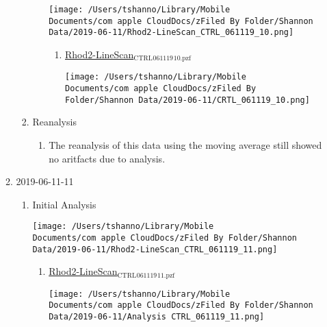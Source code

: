 \documentclass[11pt]{article}
\begin{document}
\begin{enumerate}
\begin{enumerate}
\begin{enumerate}
\begin{enumerate}
\label{sec:orgd72f3bb}
\begin{center}
\texttt{[image: /Users/tshanno/Library/Mobile Documents/com~apple~CloudDocs/zFiled By Folder/Shannon Data/2019-06-11/Rhod2-LineScan\_CTRL\_061119\_10.png]}
\end{center}
\begin{enumerate}
\item \href{file:///Users/tshanno/Library/Mobile Documents/com\~apple\~CloudDocs/zFiled By Folder/Shannon Data/2019-06-11/Rhod2-LineScan\_CTRL\_061119\_10.pzf}{Rhod2-LineScan\(_{\text{CTRL}}\)\(_{\text{061119}}\)\(_{\text{10.pzf}}\)}
\label{sec:org8c3920f}
\begin{center}
\texttt{[image: /Users/tshanno/Library/Mobile Documents/com~apple~CloudDocs/zFiled By Folder/Shannon Data/2019-06-11/CRTL\_061119\_10.png]}
\end{center}
\end{enumerate}
\end{enumerate}
\item Reanalysis
\label{sec:org20cb0ad}
\begin{enumerate}
\item The reanalysis of this data using the moving average still showed no aritfacts due to analysis.
\label{sec:orgea255bd}
\end{enumerate}
\end{enumerate}
\item 2019-06-11-11
\label{sec:org82d7336}
\begin{enumerate}
\item Initial Analysis
\label{sec:org240610e}
\begin{center}
\texttt{[image: /Users/tshanno/Library/Mobile Documents/com~apple~CloudDocs/zFiled By Folder/Shannon Data/2019-06-11/Rhod2-LineScan\_CTRL\_061119\_11.png]}
\end{center}
\begin{enumerate}
\item \href{file:///Users/tshanno/Library/Mobile Documents/com\~apple\~CloudDocs/zFiled By Folder/Shannon Data/2019-06-11/Rhod2-LineScan\_CTRL\_061119\_11.pzf}{Rhod2-LineScan\(_{\text{CTRL}}\)\(_{\text{061119}}\)\(_{\text{11.pzf}}\)}
\label{sec:orgbce48e7}
\begin{center}
\texttt{[image: /Users/tshanno/Library/Mobile Documents/com~apple~CloudDocs/zFiled By Folder/Shannon Data/2019-06-11/Analysis CTRL\_061119\_11.png]}
\end{center}
\end{enumerate}

\end{enumerate}
\end{enumerate}
\end{enumerate}
\end{document}
